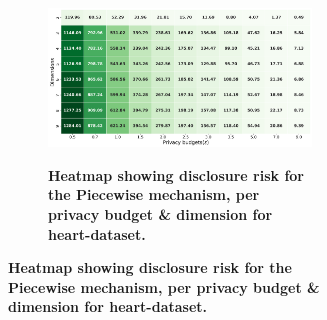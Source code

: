 \begin{figure}[H]
\begin{subfigure}[b]{0.85\textwidth}
        \begin{subfigure}[c]{1\textwidth}
            \caption{\textbf{Heatmap showing disclosure risk for the Piecewise mechanism, per privacy budget \& dimension for heart-dataset.}}
            \includegraphics[width=1\textwidth]{Results/kd-laplace/piecewise/heart-dataset/distance.png}
            \label{fig:privacy_risk_heart-dataset_adversial_advantage_piecewise}
        \end{subfigure}
    \end{subfigure}
    \hfill %
    \begin{subfigure}[b]{0.075\textwidth}

\end{subfigure}
\end{figure}
